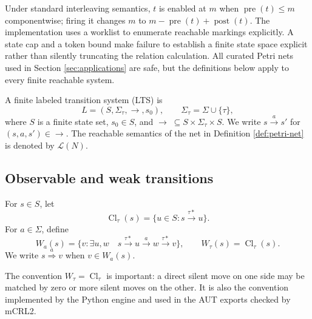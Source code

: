 \documentclass{ws-jbcb}
\numberwithin{equation}{section}
\newcommand{\TAU}{\tau}
\newcommand{\xRightarrow}[1]{\stackrel{#1}{\Longrightarrow}}
\newcommand{\LTS}{\mathcal{L}}
\begin{document}
Under standard interleaving semantics, $t$ is enabled at $m$ when
$\operatorname{pre}(t)\leq m$ componentwise; firing it changes $m$ to
$m-\operatorname{pre}(t)+\operatorname{post}(t)$. The implementation uses
a worklist to enumerate reachable markings explicitly. A state cap and a token
bound make failure to establish a finite state space explicit rather than silently
truncating the relation calculation. All curated Petri nets used in Section
\ref{sec:applications} are safe, but the definitions below apply to every finite
reachable system.

\begin{definition}\label{def:lts}
A finite labeled transition system (LTS) is
\begin{equation}\label{eq:lts}
 L=(S,\Sigma_{\TAU},\longrightarrow,s_0),\qquad
 \Sigma_{\TAU}=\Sigma\cup\{\TAU\},
\end{equation}
where $S$ is a finite state set, $s_0\in S$, and
$\longrightarrow\;\subseteq S\times\Sigma_{\TAU}\times S$. We write
$s\xrightarrow{a}s'$ for $(s,a,s')\in\longrightarrow$. The reachable semantics
of the net in Definition \ref{def:petri-net} is denoted by $\LTS(N)$.
\end{definition}

\subsection{Observable and weak transitions}\label{sec:weak-transitions}

\begin{definition}\label{def:weak-move}
For $s\in S$, let
\begin{equation}\label{eq:tau-closure}
 \operatorname{Cl}_{\TAU}(s)=
 \{u\in S:s\xrightarrow{\TAU *}u\}.
\end{equation}
For $a\in\Sigma$, define
\begin{equation}\label{eq:weak-target}
 W_a(s)=\{v:\exists u,w\quad
 s\xrightarrow{\TAU *}u\xrightarrow{a}w\xrightarrow{\TAU *}v\},
 \qquad W_{\TAU}(s)=\operatorname{Cl}_{\TAU}(s).
\end{equation}
We write $s\xRightarrow{a}v$ when $v\in W_a(s)$.
\end{definition}

The convention $W_{\TAU}=\operatorname{Cl}_{\TAU}$ is important: a direct silent
move on one side may be matched by zero or more silent moves on the other. It is
also the convention implemented by the Python engine and used in the AUT exports
checked by mCRL2.
\end{document}
